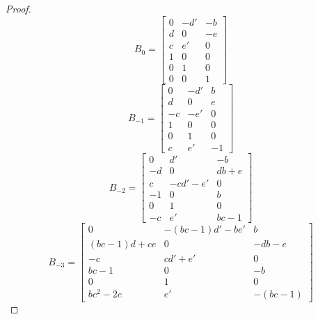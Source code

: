 \documentclass{amsart}
\numberwithin{theorem}{section}
\begin{document}
\begin{proof}
    \[B_0=\left[\begin{array}{ccc} 0 & -d' & -b \\ d & 0 & -e\\ c & e' & 0\\ 1 & 0 & 0\\ 0 & 1 & 0\\ 0 & 0 & 1\end{array}\right]\]
    \[B_{-1}=\left[\begin{array}{ccc} 0 & -d' & b \\ d & 0 & e\\ -c & -e' & 0\\ 1 & 0 & 0\\ 0 & 1 & 0\\ c & e' & -1\end{array}\right]\]
    \[B_{-2}=\left[\begin{array}{ccc} 0 & d' & -b \\ -d & 0 & db + e\\ c & -cd' - e' & 0\\ -1 & 0 & b\\ 0 & 1 & 0\\ -c & e' & bc-1\end{array}\right]\]
      \[B_{-3}=\left[\begin{array}{ccc} 0 & -(bc-1)d' - be' & b \\ (bc-1)d + ce & 0 & -db - e\\ -c & cd' + e' & 0\\ bc-1 & 0 & -b\\ 0 & 1 & 0\\ bc^2-2c & e' & -(bc-1)\end{array}\right]\]
  \end{proof}



  
\end{document}
